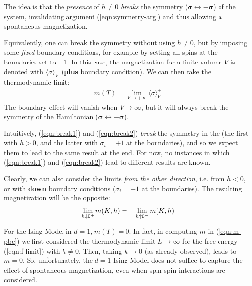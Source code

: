 \documentclass[../../main.tex]{subfiles}
\begin{document}
\medskip

The idea is that the \textit{presence} of $h \neq 0$ \textit{breaks} the symmetry ($\bm{\sigma} \leftrightarrow -\bm{\sigma}$) of the system, invalidating argument (\ref{eqn:symmetry-arg}) and thus allowing a spontaneous magnetization.

\medskip

Equivalently, one can break the symmetry without using $h \neq 0$, but by imposing some \textit{fixed} boundary conditions, for example by setting all spins at the boundaries set to $+1$. In this case, the magnetization for a finite volume $V$ is denoted with $\langle \sigma \rangle_V^+$ (\textbf{plus} boundary condition). We can then take the thermodynamic limit:
\begin{align}\label{eqn:break2}
    m(T) = \lim_{V \to +\infty} \langle \sigma \rangle_V^+
\end{align}
The boundary effect will vanish when $V \to \infty$, but it will always break the symmetry of the Hamiltonian ($\bm{\sigma} \leftrightarrow -\bm{\sigma}$).

\medskip

Intuitively, (\ref{eqn:break1}) and (\ref{eqn:break2}) \textit{break} the symmetry in the  (the first with $h>0$, and the latter with $\sigma_i = +1$ at the boundaries), and so we expect them to lead to the same result at the end. For now, no instances in which (\ref{eqn:break1}) and (\ref{eqn:break2}) lead to different results are known.

\medskip

Clearly, we can also consider the limits \textit{from the other direction}, i.e. from $h < 0$, or with \textbf{down} boundary conditions ($\sigma_i = -1$ at the boundaries). The resulting magnetization will be the opposite:
\begin{align*}
    \lim_{h \downarrow 0^+} m(K,h) = \textcolor{Red}{-} \lim_{h \uparrow 0^-} m(K,h)
\end{align*} 

For the Ising Model in $d=1$, $m(T) = 0$. In fact, in computing $m$ in (\ref{eqn:m-pbc}) we first considered the thermodynamic limit $L \to \infty$ for the free energy (\ref{eqn:f-limit}) with $h \neq 0$. Then, taking $h \to 0$ (as already observed), leads to $m = 0$. So, unfortunately, the $d=1$ Ising Model does not suffice to capture the effect of spontaneous magnetization, even when spin-spin interactions are considered. 

\medskip
\end{document}

